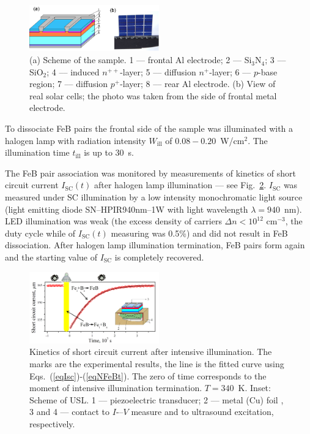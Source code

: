 \documentclass[%
 aip,jap,
 amsmath,amssymb,
 reprint,%
]{revtex4-1}
\begin{document}
\begin{figure}
\includegraphics[width=0.5\textwidth]{Fig1}%
\caption{\label{Fig:sample}
(a) Scheme of the sample.
1 –-- frontal Al electrode;
2 –-- Si$_3$N$_4$;
3 –-- SiO$_2$;
4 –-- induced $n^{++}$-layer;
5 –-- diffusion $n^+$-layer;
6 –-- $p$-base region;
7 –-- diffusion $p^+$-layer;
8 –-- rear Al electrode.
(b) View of real solar cells;
the photo was taken from the side of frontal metal electrode.
}
\end{figure}

To dissociate FeB pairs the frontal side of the sample was illuminated with a halogen lamp with radiation intensity $W_\mathrm{ill}$ of $0.08-0.20$~W/cm$^2$. 
The illumination time $t_\mathrm{ill}$ is up to 30~s.

The FeB pair association was monitored by measurements of kinetics of 
short circuit current $I_\mathrm{SC}(t)$ after halogen lamp illumination –-- see Fig.~\ref{Fig:Method}. 
$I_\mathrm{SC}$ was measured under SC illumination by a low intensity monochromatic light source (light emitting diode SN--HPIR940nm--1W with light wavelength $\lambda=940$~nm). 
LED illumination was weak 
(the excess density of carriers $\Delta n < 10^{12}$ cm$^{-3}$, 
the duty cycle while of $I_\mathrm{SC}(t)$ measuring was 0.5\%) and did not result in FeB dissociation. 
After halogen lamp illumination termination, 
FeB pairs form again and the starting value of $I_\mathrm{SC}$ is completely recovered.


\begin{figure}
\includegraphics[width=0.5\textwidth]{Fig2}%
\caption{\label{Fig:Method}
Kinetics of short circuit current after intensive illumination. 
The marks are the experimental results, 
the line is the fitted curve using Eqs.~(\ref{eqIsc})-(\ref{eqNFeBt}). 
The zero of time corresponds to the moment of intensive illumination termination. 
$T=340$~K. 
Inset: Scheme of USL. 
1 –-- piezoelectric transducer; 
2 –-- metal (Cu) foil , 
3 and 4 --- contact to $I$-–$V$ measure and to ultrasound excitation, respectively.
}
\end{figure}
\end{document}
